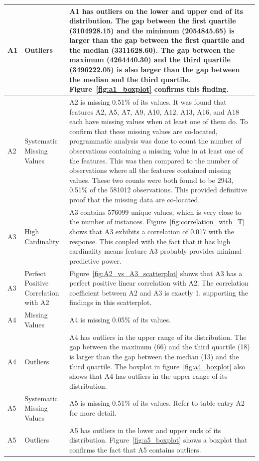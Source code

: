 \documentclass[11pt]{report}
\begin{document}
\begin{longtable}{lp{5cm}p{8cm}}
A1 & Outliers & A1 has outliers on the lower and upper end of its distribution. The gap between the first quartile (3104928.15) and the minimum (2054845.65) is larger than the gap between the first quartile and the median (3311628.60). The gap between the maximum (4264440.30) and the third quartile (3496222.05) is also larger than the gap between the median and the third quartile. Figure~\ref{fig:a1_boxplot} confirms this finding.\\ 
\midrule
A2 & Systematic Missing Values &  A2 is missing 0.51\% of its values. It was found that features A2, A5, A7, A9, A10, A12, A13, A16, and A18 each have missing values when at least one of them do. To confirm that these missing values are co-located, programmatic analysis was done to count the number of observations containing a missing value in at least one of the features. This was then compared to the number of observations where all the features contained missing values. These two counts were both found to be 2943, 0.51\% of the 581012 observations. This provided definitive proof that the missing data are co-located. \\
\midrule
A3 & High Cardinality &  A3 contains 576099 unique values, which is very close to the number of instances. Figure~\ref{fig:correlation_with_T} shows that A3 exhibits a correlation of 0.017 with the response. This coupled with the fact that it has high cardinality means feature A3 probably provides minimal predictive power.  \\
\midrule
A3 & Perfect Positive Correlation with A2 & Figure~\ref{fig:A2_vs_A3_scatterplot} shows that A3 has a perfect positive linear correlation with A2. The correlation coefficient between A2 and A3 is exactly 1, supporting the findings in this scatterplot. \\
\midrule
A4 & Missing Values &  A4 is missing 0.05\% of its values. \\
\midrule
A4 & Outliers &  A4 has outliers in the upper range of its distribution. The gap between the maximum (66) and the third quartile (18) is larger than the gap between the median (13) and the third quartile. The boxplot in figure~\ref{fig:a4_boxplot} also shows that A4 has outliers in the upper range of its distribution. \\
\midrule
A5 & Systematic Missing Values &  A5 is missing 0.51\% of its values. Refer to table entry A2 for more detail. \\
\midrule
A5 & Outliers & A5 has outliers in the lower and upper ends of its distribution. Figure~\ref{fig:a5_boxplot} shows a boxplot that confirms the fact that A5 contains outliers. \\

\end{longtable}
\end{document}
